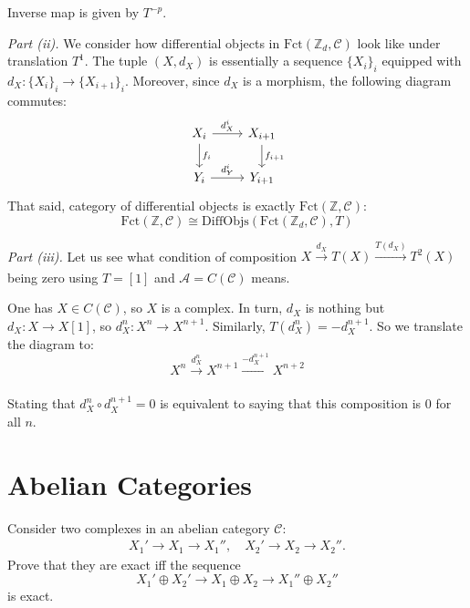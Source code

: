 \documentclass{category-template}
\begin{document}
Inverse map is given by $T^{-p}$.

\textit{Part (ii).} We consider how differential objects in
$\text{Fct}(\mathbb{Z}_d, \mathcal{C})$ look like under translation $T^1$. The
tuple $(X,d_X)$ is essentially a sequence $\{X_i\}_i$ equipped with 
$d_X: \{X_i\}_i \to \{X_{i+1}\}_i$. Moreover, since $d_X$ is a morphism,
the following diagram commutes:
\[
\begin{tikzcd} X_i \arrow{r}{d_X^i} \arrow{d}{f_i} & X_{i+1} \arrow{d}{f_{i+1}} \\ Y_i \arrow{r}{d_Y^i} & Y_{i+1} \end{tikzcd}
\]
That said, category of differential objects is exactly $\text{Fct}(\mathbb{Z},\mathcal{C})$:
\begin{equation*}
    \text{Fct}(\mathbb{Z},\mathcal{C}) \cong \text{DiffObjs}(\text{Fct}(\mathbb{Z}_d,\mathcal{C}), T)
\end{equation*}

\textit{Part (iii).} Let us see what condition of composition $X
\xrightarrow[]{d_X} T(X) \xrightarrow[]{T(d_X)} T^2(X)$ being zero using $T=[1]$
and $\mathcal{A}=C(\mathcal{C})$ means.

One has $X \in C(\mathcal{C})$, so $X$ is a complex. In turn, $d_X$ is nothing
but $d_X: X \to X[1]$, so $d_X^n: X^n \to X^{n+1}$. Similarly, $T(d_X^n) =
-d_X^{n+1}$. So we translate the diagram to:
\begin{equation*}
    X^n \xrightarrow[]{d_X^n} X^{n+1} \xrightarrow[]{-d_X^{n+1}} X^{n+2}
\end{equation*}

Stating that $d_X^n \circ d_X^{n+1} = 0$ is equivalent to saying that this 
composition is $0$ for all $n$.

\section{Abelian Categories}

\begin{problem}
    Consider two complexes in an abelian category $\mathcal{C}$:
    \begin{gather*}
        X_1' \to X_1 \to X_{1}'', \quad X_2' \to X_2 \to X_2''.
    \end{gather*}
    Prove that they are exact iff the sequence
    \begin{equation*}
        X_1' \oplus X_2' \to X_1 \oplus X_2 \to X_1'' \oplus X_2''
    \end{equation*}
    is exact.
\end{problem}
\end{document}
